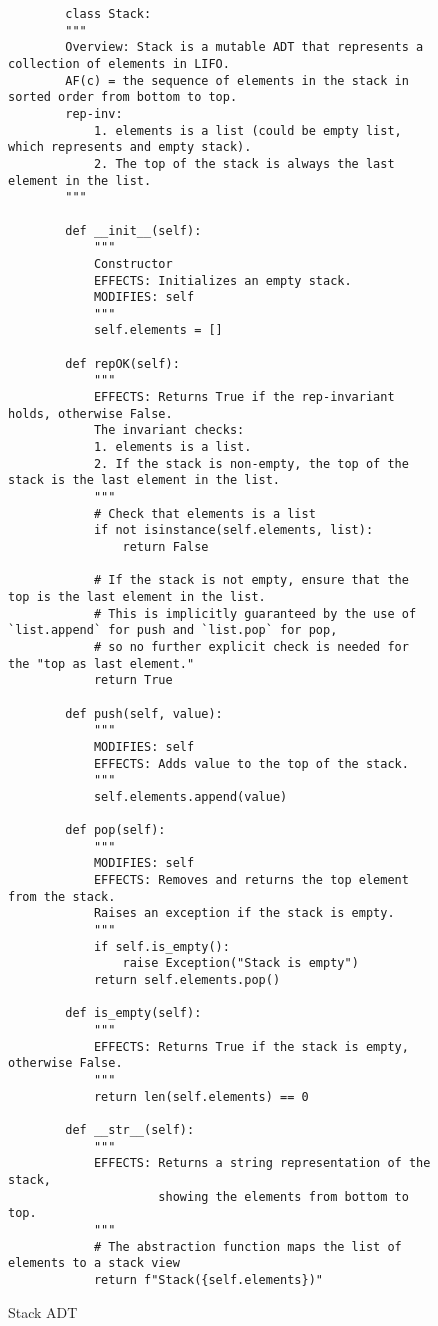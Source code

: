 \documentclass[oneside,11pt,dvipsnames]{book}
\begin{document}
\begin{figure}
    \begin{lstlisting}
        class Stack:
        """
        Overview: Stack is a mutable ADT that represents a collection of elements in LIFO.
        AF(c) = the sequence of elements in the stack in sorted order from bottom to top.
        rep-inv: 
            1. elements is a list (could be empty list, which represents and empty stack).
            2. The top of the stack is always the last element in the list.
        """
    
        def __init__(self):
            """
            Constructor
            EFFECTS: Initializes an empty stack.
            MODIFIES: self
            """
            self.elements = []
    
        def repOK(self):
            """
            EFFECTS: Returns True if the rep-invariant holds, otherwise False.
            The invariant checks:
            1. elements is a list.
            2. If the stack is non-empty, the top of the stack is the last element in the list.
            """
            # Check that elements is a list
            if not isinstance(self.elements, list):
                return False
            
            # If the stack is not empty, ensure that the top is the last element in the list.
            # This is implicitly guaranteed by the use of `list.append` for push and `list.pop` for pop,
            # so no further explicit check is needed for the "top as last element."
            return True
    
        def push(self, value):
            """
            MODIFIES: self
            EFFECTS: Adds value to the top of the stack.
            """
            self.elements.append(value)
    
        def pop(self):
            """
            MODIFIES: self
            EFFECTS: Removes and returns the top element from the stack. 
            Raises an exception if the stack is empty.
            """
            if self.is_empty():
                raise Exception("Stack is empty")
            return self.elements.pop()
    
        def is_empty(self):
            """
            EFFECTS: Returns True if the stack is empty, otherwise False.
            """
            return len(self.elements) == 0
    
        def __str__(self):
            """
            EFFECTS: Returns a string representation of the stack,
                     showing the elements from bottom to top.
            """
            # The abstraction function maps the list of elements to a stack view
            return f"Stack({self.elements})"
    \end{lstlisting}
    \caption{Stack ADT}\label{ex:stack}
\end{figure}
    
\end{document}
